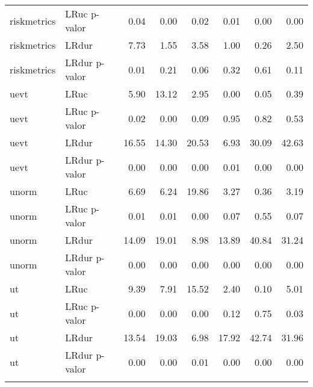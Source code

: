 \begin{longtable}{llrrrrrr}
  riskmetrics & LRuc p-valor & 0.04 & 0.00 & 0.02 & 0.01 & 0.00 & 0.00 \\ 
  riskmetrics & LRdur & 7.73 & 1.55 & 3.58 & 1.00 & 0.26 & 2.50 \\ 
  riskmetrics & LRdur p-valor & 0.01 & 0.21 & 0.06 & 0.32 & 0.61 & 0.11 \\ 
  uevt & LRuc & 5.90 & 13.12 & 2.95 & 0.00 & 0.05 & 0.39 \\ 
  uevt & LRuc p-valor & 0.02 & 0.00 & 0.09 & 0.95 & 0.82 & 0.53 \\ 
  uevt & LRdur & 16.55 & 14.30 & 20.53 & 6.93 & 30.09 & 42.63 \\ 
  uevt & LRdur p-valor & 0.00 & 0.00 & 0.00 & 0.01 & 0.00 & 0.00 \\ 
  unorm & LRuc & 6.69 & 6.24 & 19.86 & 3.27 & 0.36 & 3.19 \\ 
  unorm & LRuc p-valor & 0.01 & 0.01 & 0.00 & 0.07 & 0.55 & 0.07 \\ 
  unorm & LRdur & 14.09 & 19.01 & 8.98 & 13.89 & 40.84 & 31.24 \\ 
  unorm & LRdur p-valor & 0.00 & 0.00 & 0.00 & 0.00 & 0.00 & 0.00 \\ 
  ut & LRuc & 9.39 & 7.91 & 15.52 & 2.40 & 0.10 & 5.01 \\ 
  ut & LRuc p-valor & 0.00 & 0.00 & 0.00 & 0.12 & 0.75 & 0.03 \\ 
  ut & LRdur & 13.54 & 19.03 & 6.98 & 17.92 & 42.74 & 31.96 \\ 
  ut & LRdur p-valor & 0.00 & 0.00 & 0.01 & 0.00 & 0.00 & 0.00 \\ 
   \hline
\hline
\label{tab:vartest}
\end{longtable}
